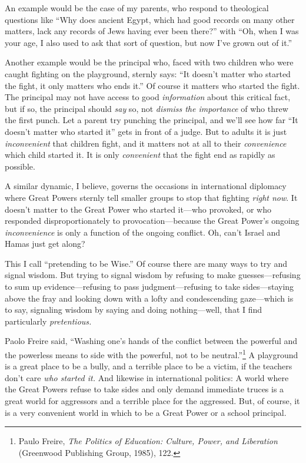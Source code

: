 {
 An example would be the case of my parents, who respond to
theological questions like ``Why does ancient Egypt,
which had good records on many other matters, lack any records of Jews
having ever been there?'' with ``Oh,
when I was your age, I also used to ask that sort of question, but now
I've grown out of it.''}

{
 Another example would be the principal who, faced with two
children who were caught fighting on the playground, sternly says:
``It doesn't matter who started the
fight, it only matters who ends it.'' Of course it
matters who started the fight. The principal may not have access to
good \textit{information} about this critical fact, but if so, the
principal should \textit{say} so, not \textit{dismiss the importance}
of who threw the first punch. Let a parent try punching the principal,
and we'll see how far ``It
doesn't matter who started it'' gets
in front of a judge. But to adults it is just \textit{inconvenient}
that children fight, and it matters not at all to their
\textit{convenience} which child started it. It is only
\textit{convenient} that the fight end as rapidly as possible.}

{
 A similar dynamic, I believe, governs the occasions in
international diplomacy where Great Powers sternly tell smaller groups
to stop that fighting \textit{right now}. It doesn't
matter to the Great Power who started it---who provoked, or who
responded disproportionately to provocation---because the Great
Power's ongoing \textit{inconvenience} is only a
function of the ongoing conflict. Oh, can't Israel and
Hamas just get along?}

{
 This I call ``pretending to be
Wise.'' Of course there are many ways to try and
signal wisdom. But trying to signal wisdom by refusing to make
guesses---refusing to sum up evidence---refusing to pass
judgment---refusing to take sides---staying above the fray and looking
down with a lofty and condescending gaze---which is to say, signaling
wisdom by saying and doing nothing---well, that I find particularly
\textit{pretentious.}}

{
 Paolo Freire said, ``Washing
one's hands of the conflict between the powerful and
the powerless means to side with the powerful, not to be
neutral.''\footnote{Paulo Freire, \textit{The Politics of Education: Culture,
Power, and Liberation} (Greenwood Publishing Group, 1985), 122.} A playground is a great
place to be a bully, and a terrible place to be a victim, if the
teachers don't care \textit{who started it.} And
likewise in international politics: A world where the Great Powers
refuse to take sides and only demand immediate truces is a great world
for aggressors and a terrible place for the aggressed. But, of course,
it is a very convenient world in which to be a Great Power or a school
principal.}

